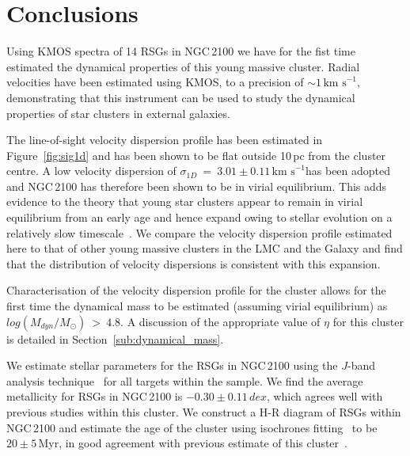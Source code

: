 \documentclass[useAMS,usenatbib]{mn2e}
\def\kms{$\mbox{km s}^{-1}$}
\begin{document}

\section{Conclusions} %
\label{sec:conclusions}

Using KMOS spectra of 14 RSGs in NGC\,2100 we have for the fist time estimated the dynamical properties of this young massive cluster.
Radial velocities have been estimated using KMOS, to a precision of $\sim1$\,\kms, demonstrating that this instrument can be used to study the dynamical properties of star clusters in external galaxies.

The line-of-sight velocity dispersion profile has been estimated in Figure~\ref{fig:sig1d} and has been shown to be flat outside 10\,pc from the cluster centre.
A low velocity dispersion of $\sigma_{1D}~=~3.01\pm0.11\,$\kms has been adopted and NGC\,2100 has therefore been shown to be in virial equilibrium.
This adds evidence to the theory that young star clusters appear to remain in virial equilibrium from an early age and hence expand owing to stellar evolution on a relatively slow timescale~\citep[10\,Myr][]{2010ARA&A..48..431P}.
We compare the velocity dispersion profile estimated here to that of other young massive clusters in the LMC and the Galaxy and find that the distribution of velocity dispersions is consistent with this expansion.

Characterisation of the velocity dispersion profile for the cluster allows for the first time the dynamical mass to be estimated (assuming virial equilibrium) as $log(M_{dyn}/M_{\odot})~>~4.8$.
A discussion of the appropriate value of $\eta$ for this cluster is detailed in Section~\ref{sub:dynamical_mass}.

We estimate stellar parameters for the RSGs in NGC\,2100 using the $J$-band analysis technique~\citep{2010MNRAS.407.1203D} for all targets within the sample.
We find the average metallicity for RSGs in NGC\,2100 is $-0.30\pm0.11\,dex$, which agrees well with previous studies within this cluster.
We construct a H-R diagram of RSGs within NGC\,2100 and estimate the age of the cluster using isochrones fitting~\citep{2012A&A...537A.146E,2013A&A...558A.103G} to be $20\pm5\,$Myr, in good agreement with previous estimate of this cluster~\citep{2015A&A...575A..62N}.
\end{document}
